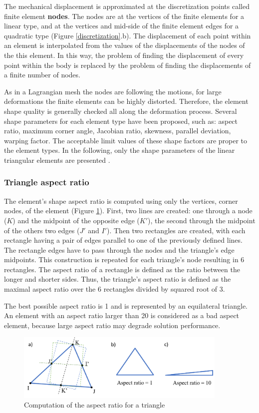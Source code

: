  The mechanical displacement is approximated at the discretization points called finite element \textbf{nodes}. The nodes are at the vertices of the finite elements for a linear type, and at the vertices and mid-side of the finite element edges for a quadratic type (Figure \ref{discretization}.b). The displacement of each point within an element is interpolated from the values of the displacements of the nodes of the this element. In this way, the problem of finding the displacement of every point within the body is replaced by the problem of finding the displacements of a finite number of nodes.
 
 As in a Lagrangian mesh the nodes are following the motions, for large deformations the finite elements can be highly distorted. Therefore, the element shape quality is generally checked all along the deformation process. Several shape parameters for each element type have been proposed, such as: aspect ratio, maximum corner angle, Jacobian ratio, skewness, parallel deviation, warping factor. The acceptable limit values of these shape factors are proper to the element types.
In the following, only the shape parameters of the linear triangular elements are presented \citep{ansys_theory_2017}.  
 \subsubsection*{Triangle aspect ratio }
 The element's shape aspect ratio is computed using only the vertices, corner nodes, of the element (Figure \ref{fig:aspectratio}). First, two lines are created: one through a node ($K$) and the midpoint of the opposite edge ($ K'$), the second through the midpoint of the others two edges ($J'$ and $ I'$). Then two rectangles are created, with each rectangle having a pair of edges parallel to one of the previously defined lines. The rectangle edges have to pass through the nodes and the triangle's edge midpoints. This construction is repeated for each triangle's node resulting in 6 rectangles. The aspect ratio of a rectangle is defined as the ratio between the longer and shorter sides. Thus, the triangle's aspect ratio is defined as the maximal aspect ratio over the 6 rectangles divided by squared root of 3. 
 
 The best possible aspect ratio is 1 and is represented by an equilateral triangle. An element with an aspect ratio larger than 20 is considered as a bad aspect element, because large aspect ratio may degrade solution performance.
 
 \begin{figure}[!h]
\centering
\includegraphics[width=0.9\textwidth,keepaspectratio]{figures/aspectRatio.png} 
\caption{Computation of the aspect ratio for a triangle}
\label{fig:aspectratio}
\end{figure}  

